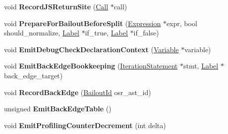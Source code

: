 \begin{DoxyCompactItemize}
\item 
void {\bfseries Record\+J\+S\+Return\+Site} (\hyperlink{classv8_1_1internal_1_1_call}{Call} $\ast$call)\hypertarget{classv8_1_1internal_1_1_full_code_generator_ae0b56906cf0b82f407ef405f12928025}{}\label{classv8_1_1internal_1_1_full_code_generator_ae0b56906cf0b82f407ef405f12928025}

\item 
void {\bfseries Prepare\+For\+Bailout\+Before\+Split} (\hyperlink{classv8_1_1internal_1_1_expression}{Expression} $\ast$expr, bool should\+\_\+normalize, \hyperlink{classv8_1_1internal_1_1_label}{Label} $\ast$if\+\_\+true, \hyperlink{classv8_1_1internal_1_1_label}{Label} $\ast$if\+\_\+false)\hypertarget{classv8_1_1internal_1_1_full_code_generator_abd14bab2ed69bdf751891899ff0e3a0a}{}\label{classv8_1_1internal_1_1_full_code_generator_abd14bab2ed69bdf751891899ff0e3a0a}

\item 
void {\bfseries Emit\+Debug\+Check\+Declaration\+Context} (\hyperlink{classv8_1_1internal_1_1_variable}{Variable} $\ast$variable)\hypertarget{classv8_1_1internal_1_1_full_code_generator_a578605e8e2c49ca3bb0b33c7ced6ea27}{}\label{classv8_1_1internal_1_1_full_code_generator_a578605e8e2c49ca3bb0b33c7ced6ea27}

\item 
void {\bfseries Emit\+Back\+Edge\+Bookkeeping} (\hyperlink{classv8_1_1internal_1_1_iteration_statement}{Iteration\+Statement} $\ast$stmt, \hyperlink{classv8_1_1internal_1_1_label}{Label} $\ast$back\+\_\+edge\+\_\+target)\hypertarget{classv8_1_1internal_1_1_full_code_generator_a808ec71684cceae26ae8c3179a7087ad}{}\label{classv8_1_1internal_1_1_full_code_generator_a808ec71684cceae26ae8c3179a7087ad}

\item 
void {\bfseries Record\+Back\+Edge} (\hyperlink{classv8_1_1internal_1_1_bailout_id}{Bailout\+Id} osr\+\_\+ast\+\_\+id)\hypertarget{classv8_1_1internal_1_1_full_code_generator_a31362b696567267af912e1648f64acd2}{}\label{classv8_1_1internal_1_1_full_code_generator_a31362b696567267af912e1648f64acd2}

\item 
unsigned {\bfseries Emit\+Back\+Edge\+Table} ()\hypertarget{classv8_1_1internal_1_1_full_code_generator_ac270e7e46ca5f6bdd1a5b3106712398b}{}\label{classv8_1_1internal_1_1_full_code_generator_ac270e7e46ca5f6bdd1a5b3106712398b}

\item 
void {\bfseries Emit\+Profiling\+Counter\+Decrement} (int delta)\hypertarget{classv8_1_1internal_1_1_full_code_generator_afb0b591f6141daffff484139e1218559}{}\label{classv8_1_1internal_1_1_full_code_generator_afb0b591f6141daffff484139e1218559}


\end{DoxyCompactItemize}
